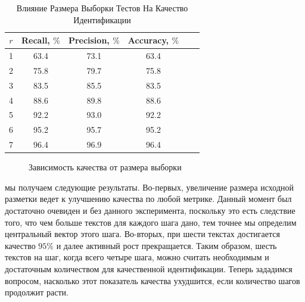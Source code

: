 \documentclass[12pt]{article}
\begin{document}
\begin{table}[h!]
\centering
\begin{tabular}{||c|c|c|c|c|c||}
\hline
$r$ & Recall, $\%$ &Precision, $\%$ &Accuracy, $\%$ \\
\hline
1 &	63.4 &	73.1 &	63.4 \\
\hline
2 &	75.8 &	79.7 &	75.8 \\
\hline
3 &	83.5 &	85.5 &	83.5 \\
\hline
4 &	88.6 &	89.8 &	88.6\\
\hline
5 &	92.2 &	93.0 &	92.2\\
\hline
6 &	95.2 &	95.7 &	95.2\\
\hline
7 &	96.4 &	96.9 &	96.4\\
\hline
\end{tabular}
\caption{Влияние Размера Выборки Тестов На Качество Идентификации}
\label{table:5}
\end{table}

\begin{figure}[h!]
\label{fig:image1}
 \caption{Зависимость качества от размера выборки}
\end{figure}

мы получаем  следующие результаты. Во-первых, увеличение размера исходной разметки ведет к улучшению качества по любой метрике. Данный момент был достаточно очевиден и без данного эксперимента, поскольку это есть следствие того, что чем больше текстов для каждого шага дано, тем точнее мы определим центральный вектор этого шага. Во-вторых, при шести текстах достигается качество $95\%$ и далее активный рост прекращается. Таким образом, шесть текстов на шаг, когда всего четыре шага, можно считать необходимым и достаточным количеством для качественной идентификации. Теперь зададимся вопросом, насколько этот показатель качества ухудшится, если количество шагов продолжит расти.
\end{document}
